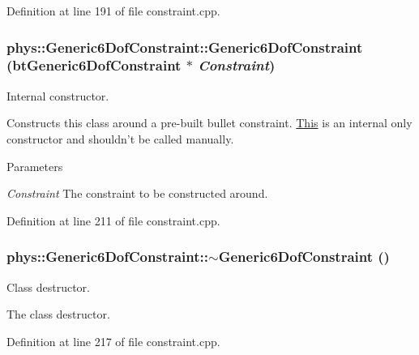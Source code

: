 Definition at line 191 of file constraint.cpp.

\hypertarget{classphys_1_1Generic6DofConstraint_a7e44417fc8f56eb1770990fa3c3273d3}{
\subsubsection[{Generic6DofConstraint}]{\setlength{\rightskip}{0pt plus 5cm}phys::Generic6DofConstraint::Generic6DofConstraint (btGeneric6DofConstraint $\ast$ {\em Constraint})}}
\label{de/d2a/classphys_1_1Generic6DofConstraint_a7e44417fc8f56eb1770990fa3c3273d3}


Internal constructor. 

Constructs this class around a pre-\/built bullet constraint. \hyperlink{structThis}{This} is an internal only constructor and shouldn't be called manually. 
\begin{DoxyParams}{Parameters}
\item[{\em Constraint}]The constraint to be constructed around. \end{DoxyParams}


Definition at line 211 of file constraint.cpp.

\hypertarget{classphys_1_1Generic6DofConstraint_a0b0bd2e1f1546ed1e6b2ebc2a505a126}{
\subsubsection[{$\sim$Generic6DofConstraint}]{\setlength{\rightskip}{0pt plus 5cm}phys::Generic6DofConstraint::$\sim$Generic6DofConstraint ()}}
\label{de/d2a/classphys_1_1Generic6DofConstraint_a0b0bd2e1f1546ed1e6b2ebc2a505a126}


Class destructor. 

The class destructor. 

Definition at line 217 of file constraint.cpp.




